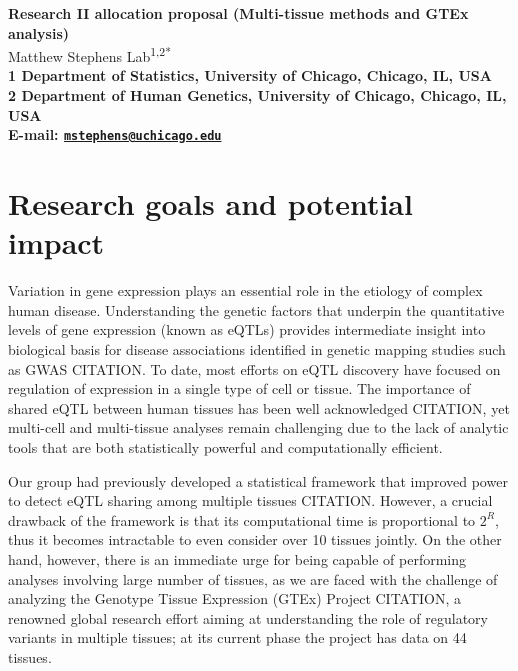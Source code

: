 \documentclass[10pt]{article}
\date{}
\begin{document}
\begin{flushleft}
{\Large
\textbf{Research II allocation proposal (Multi-tissue methods and GTEx analysis)}
}
\\
  Matthew Stephens Lab\textsuperscript{1,2*}\\
\bf{1} Department of Statistics, University of Chicago,  Chicago,  IL,  USA
\\
\bf{2} Department of Human Genetics, University of Chicago,  Chicago,  IL,  USA
\\

\textasteriskcentered{} E-mail:   \href{mailto:mstephens@uchicago.edu}{\nolinkurl{mstephens@uchicago.edu}}

\end{flushleft}

\section*{Research goals and potential
impact}\label{research-goals-and-the-potential-impact}
Variation in gene expression plays an essential role in the etiology of complex human disease.
Understanding the genetic factors that underpin the quantitative levels of gene expression (known as eQTLs) provides intermediate insight into biological basis for disease associations identified in genetic mapping studies such as GWAS CITATION. 
To date, most efforts on eQTL discovery have focused on regulation of expression in a single type of cell or tissue. 
The importance of shared eQTL between human tissues has been well acknowledged CITATION, yet multi-cell and multi-tissue analyses remain challenging due to the lack of analytic tools that are both statistically powerful and computationally efficient.

Our group had previously developed a statistical framework that improved power to detect
eQTL sharing among multiple tissues CITATION. 
However, a crucial drawback of the framework is that its computational time is proportional to $2^R$, thus it becomes intractable to even consider over 10 tissues jointly. 
On the other hand, however, there is an immediate urge for being capable of performing analyses involving large number of tissues, as we are faced with the challenge of analyzing the Genotype Tissue Expression (GTEx) Project CITATION, a renowned global research effort aiming at understanding the role of regulatory variants in multiple tissues; at its current phase the project has data on 44 tissues.
\end{document}
